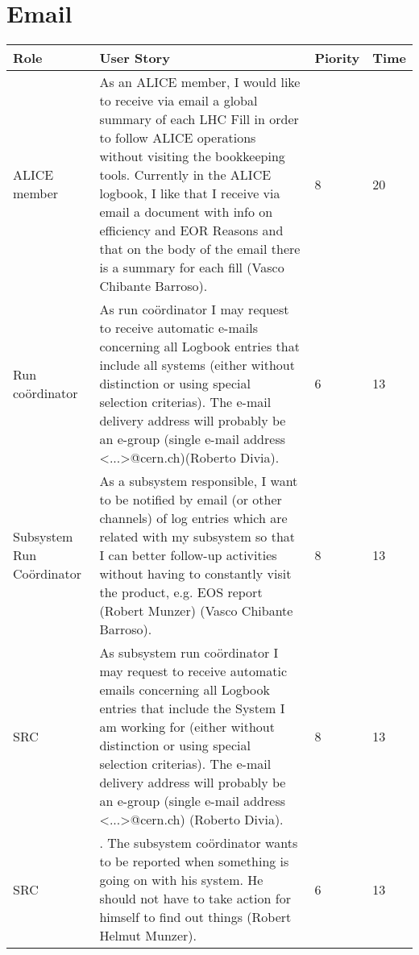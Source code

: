 \section{Email}
\begin{longtable}{ | p{2cm} | p{8cm} | p{1.5cm} | l |}
\hline
Role & User Story & Piority & Time \\ \hline
ALICE member & As an ALICE member, I would like to receive via email a global summary of each LHC Fill in order to follow ALICE operations without visiting the bookkeeping tools. Currently in the ALICE logbook, I like that I receive via email a document with info on efficiency and EOR Reasons and that on the body of the email there is a summary for
each fill (Vasco Chibante Barroso). & 8 & 20 \\ \hline
Run coördinator & As run coördinator I may request to receive automatic e-mails concerning all Logbook entries that include all systems (either without distinction or using special selection criterias). The e-mail delivery address will probably be an e-group (single e-mail address <...>@cern.ch)(Roberto Divia). & 6 & 13 \\ \hline
Subsystem Run Coördinator &  As a subsystem responsible, I want to be notified by email (or other
channels) of log entries which are related with my subsystem so that I can better follow-up activities without having to constantly visit the product, e.g. EOS report (Robert Munzer) (Vasco Chibante Barroso). & 8 & 13 \\ \hline
SRC & As subsystem run coördinator I may request to receive automatic emails concerning all Logbook entries that include the System I am working for (either without distinction or using special selection criterias). The e-mail delivery address will probably be an e-group (single e-mail address <...>@cern.ch) (Roberto Divia). & 8 & 13 \\ \hline
SRC & . The subsystem coördinator wants to be reported when something is going on with his system. He should not have to take action for himself to find out things (Robert Helmut Munzer). & 6 & 13 \\ \hline

\end{longtable}
\newpage
